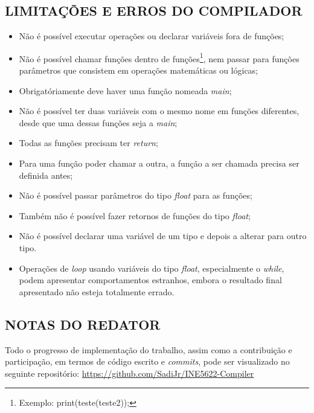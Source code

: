	\subsection{\normalsize LIMITAÇÕES E ERROS DO COMPILADOR}
	\begin{itemize}
		\item Não é possível executar operações ou declarar variáveis fora de funções;
		\item Não é possível chamar funções dentro de funções\footnote{Exemplo: print(teste(teste2));}, nem passar para funções parâmetros que consistem em operações matemáticas ou lógicas;
		\item Obrigatóriamente deve haver uma função nomeada \textit{main};
		\item Não é possível ter duas variáveis com o mesmo nome em funções diferentes, desde que uma dessas funções seja a \textit{main};
		\item Todas as funções precisam ter \textit{return};
		\item Para uma função poder chamar a outra, a função a ser chamada precisa ser definida antes;
		\item Não é possível passar parâmetros do tipo \textit{float} para as funções;
		\item Também não é possível fazer retornos de funções do tipo \textit{float};
		\item Não é possível declarar uma variável de um tipo e depois a alterar para outro tipo.
		\item Operações de \textit{loop} usando variáveis do tipo \textit{float}, especialmente o \textit{while}, podem apresentar comportamentos estranhos, embora o resultado final apresentado não esteja totalmente errado.
	\end{itemize}
	
	\subsection{\normalsize NOTAS DO REDATOR}
	Todo o progresso de implementação do trabalho, assim como a contribuição e participação, em termos de código escrito e \textit{commits}, pode ser visualizado no seguinte repositório: \url{https://github.com/SadiJr/INE5622-Compiler}